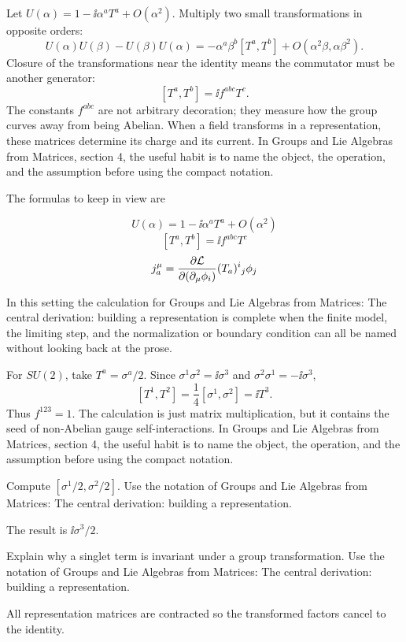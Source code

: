 Let \(U(\alpha)=1-\ii\alpha^aT^a+O(\alpha^2)\).  Multiply two small transformations in opposite orders:
\[
  U(\alpha)U(\beta)-U(\beta)U(\alpha)
  =
  -\alpha^a\beta^b[T^a,T^b]+O(\alpha^2\beta,\alpha\beta^2).
\]
Closure of the transformations near the identity means the commutator must be another generator:
\[
  [T^a,T^b]=\ii f^{abc}T^c.
\]
The constants \(f^{abc}\) are not arbitrary decoration; they measure how the group curves away from being Abelian.  When a field transforms in a representation, these matrices determine its charge and its current.  In Groups and Lie Algebras from Matrices, section 4, the useful habit is to name the object, the operation, and the assumption before using the compact notation.

The formulas to keep in view are

\[
  U(\alpha)=1-\ii\alpha^aT^a+O(\alpha^2)
\]
\[
  [T^a,T^b]=\ii f^{abc}T^c
\]
\[
  j^\mu_a=\frac{\partial\mathcal L}{\partial(\partial_\mu\phi_i)}(T_a)^i{}_j\phi_j
\]

In this setting the calculation for Groups and Lie Algebras from Matrices: The central derivation: building a representation is complete when the finite model, the limiting step, and the normalization or boundary condition can all be named without looking back at the prose.




\begin{example}
For \(SU(2)\), take \(T^a=\sigma^a/2\).  Since \(\sigma^1\sigma^2=\ii\sigma^3\) and \(\sigma^2\sigma^1=-\ii\sigma^3\),
\[
  [T^1,T^2]=\frac14[\sigma^1,\sigma^2]=\ii T^3.
\]
Thus \(f^{123}=1\).  The calculation is just matrix multiplication, but it contains the seed of non-Abelian gauge self-interactions.  In Groups and Lie Algebras from Matrices, section 4, the useful habit is to name the object, the operation, and the assumption before using the compact notation.
\end{example}



\begin{exercise}
Compute \([\sigma^1/2,\sigma^2/2]\).  Use the notation of Groups and Lie Algebras from Matrices: The central derivation: building a representation.
\begin{answer}
The result is \(\ii\sigma^3/2\).
\end{answer}
\end{exercise}

\begin{exercise}
Explain why a singlet term is invariant under a group transformation.  Use the notation of Groups and Lie Algebras from Matrices: The central derivation: building a representation.
\begin{answer}
All representation matrices are contracted so the transformed factors cancel to the identity.
\end{answer}
\end{exercise}



